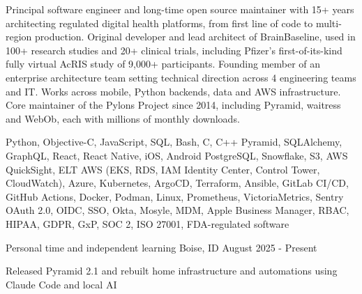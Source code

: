 \documentclass{resume}
\begin{document}

Principal software engineer and long-time open source maintainer with 15+ years architecting regulated digital health platforms, from first line of code to multi-region production.
Original developer and lead architect of BrainBaseline, used in 100+ research studies and 20+ clinical trials, including Pfizer's first-of-its-kind fully virtual AcRIS study of 9,000+ participants.
Founding member of an enterprise architecture team setting technical direction across 4 engineering teams and IT.
Works across mobile, Python backends, data and AWS infrastructure.
Core maintainer of the Pylons Project since 2014, including Pyramid, waitress and WebOb, each with millions of monthly downloads.

 Python, Objective-C, JavaScript, SQL, Bash, C, C++
 Pyramid, SQLAlchemy, GraphQL, React, React Native, iOS, Android
 PostgreSQL, Snowflake, S3, AWS QuickSight, ELT
 AWS (EKS, RDS, IAM Identity Center, Control Tower, CloudWatch), Azure, Kubernetes, ArgoCD, Terraform, Ansible, GitLab CI/CD, GitHub Actions, Docker, Podman, Linux, Prometheus, VictoriaMetrics, Sentry
 OAuth 2.0, OIDC, SSO, Okta, Mosyle, MDM, Apple Business Manager, RBAC, HIPAA, GDPR, GxP, SOC 2, ISO 27001, FDA-regulated software


            {Personal time and independent learning}
            {Boise, ID}
            {August 2025 - Present}
\begin{resumeItems}
\item Released Pyramid 2.1 and rebuilt home infrastructure and automations using Claude Code and local AI
\end{resumeItems}
\end{document}
